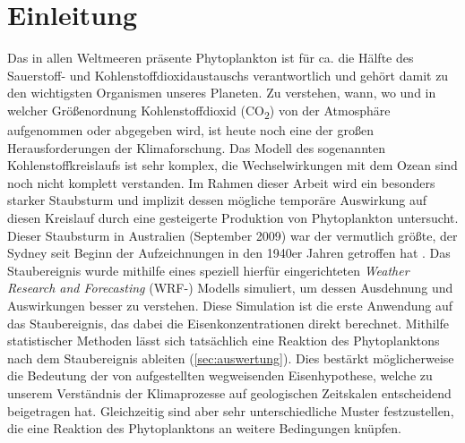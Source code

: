 \documentclass[12pt,a4paper,onecolumn,headheight=30pt]{scrartcl}
\newcommand{\cotwo}{CO\textsubscript{2}}
\begin{document}
\section{Einleitung} \label{sec:einleitung}
\sloppy %
Das in allen Weltmeeren präsente Phytoplankton ist für ca. die Hälfte des Sauerstoff- und Kohlenstoffdioxidaustauschs verantwortlich \citep{Emerson.2009} und gehört damit zu den wichtigsten Organismen unseres Planeten. Zu verstehen, wann, wo und in welcher Größenordnung Kohlenstoffdioxid (\cotwo) von der Atmosphäre aufgenommen oder abgegeben wird, ist heute noch eine der großen Herausforderungen der Klimaforschung. Das Modell des sogenannten Kohlenstoffkreislaufs ist sehr komplex, die Wechselwirkungen mit dem Ozean sind noch nicht komplett verstanden. Im Rahmen dieser Arbeit wird ein besonders starker Staubsturm und implizit dessen mögliche temporäre Auswirkung auf diesen Kreislauf durch eine gesteigerte Produktion von Phytoplankton untersucht. Dieser Staubsturm in Australien (September 2009) war der vermutlich größte, der Sydney seit Beginn der Aufzeichnungen in den 1940er Jahren getroffen hat \citep{Leys.2011}. Das Staubereignis wurde mithilfe eines speziell hierfür eingerichteten \textit{Weather Research and Forecasting} (WRF-) Modells simuliert, um dessen Ausdehnung und Auswirkungen besser zu verstehen. Diese Simulation ist die erste Anwendung auf das Staubereignis, das dabei die Eisenkonzentrationen direkt berechnet. Mithilfe statistischer Methoden lässt sich tatsächlich eine Reaktion des Phytoplanktons nach dem Staubereignis ableiten (\ref{sec:auswertung}). Dies bestärkt möglicherweise die Bedeutung der von \citet{Martin.1990} aufgestellten wegweisenden Eisenhypothese, welche zu unserem Verständnis der Klimaprozesse auf geologischen Zeitskalen entscheidend beigetragen hat. Gleichzeitig sind aber sehr unterschiedliche Muster festzustellen, die eine Reaktion des Phytoplanktons an weitere Bedingungen knüpfen.
\end{document}
